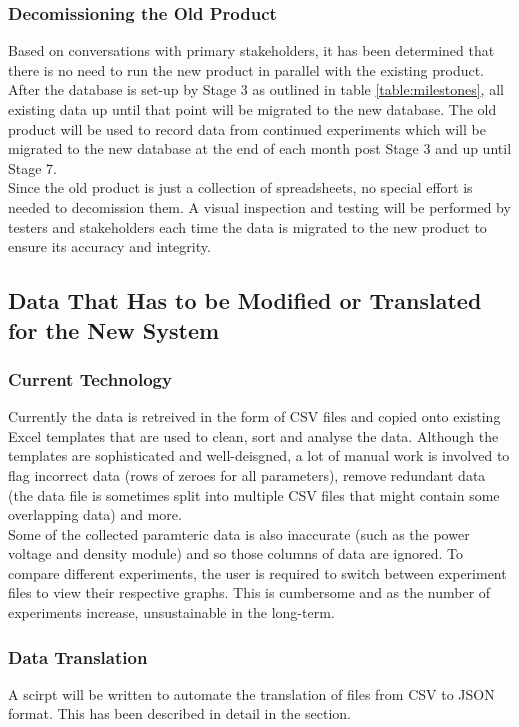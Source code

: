 \documentclass[12pt]{article}
\begin{document}
\subsubsection{Decomissioning the Old Product}
Based on conversations with primary stakeholders, it has been determined that there is no need to run the new product in parallel with the existing product. After the database is set-up
by Stage 3 as outlined in table \ref{table:milestones}, all existing data up until that point will be migrated to the new database. The old product will be used to record data from continued experiments
which will be migrated to the new database at the end of each month post Stage 3 and up until Stage 7.\\
\newline
Since the old product is just a collection of spreadsheets, no special effort is needed to decomission them. A visual inspection and testing will be performed by testers and stakeholders 
each time the data is migrated to the new product to ensure its accuracy and integrity.

\subsection{Data That Has to be Modified or Translated for the New System}
\subsubsection{Current Technology}
Currently the data is retreived in the form of CSV files and copied onto existing Excel templates that are used to clean, sort and analyse 
the data. Although the templates are sophisticated and well-deisgned, a lot of manual work is involved to flag incorrect data (rows of zeroes for 
all parameters), remove redundant data (the data file is sometimes split into multiple CSV files that might contain some overlapping data) and more.\\
\newline
Some of the collected paramteric data is also inaccurate (such as the power voltage and density module) and so those columns of data are ignored.
To compare different experiments, the user is required to switch between experiment files to view their respective graphs. This is cumbersome and as 
the number of experiments increase, unsustainable in the long-term.

\subsubsection{Data Translation}
A scirpt will be written to automate the translation of files from CSV to JSON format. This has been described in detail in the  section.
\end{document}
